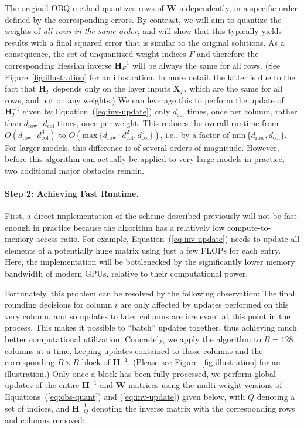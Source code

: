 The original OBQ method quantizes rows of $\mathbf{W}$ independently, in a specific order defined by the corresponding errors. By contrast, we will aim to quantize the weights of \emph{all rows in the same order}, and will show that this typically yields results with a final squared error that is similar to the original solutions. As a consequence, the set of unquantized weight indices $F$ and therefore the corresponding Hessian inverse $\mathbf{H}_F^{-1}$ will be always the same for all rows. (See Figure~\ref{fig:illustration} for an illustration. In more detail, the latter is due to the fact that $\mathbf{H}_F$ depends only on the layer inputs $\mathbf{X}_F$, which are the same for all rows, and not on any weights.) We can leverage this to perform the update of $\mathbf{H}_F^{-1}$ given by Equation~(\ref{eq:inv-update}) only $d_\text{col}$ times, once per column, rather than $d_\text{row} \cdot d_\text{col}$ times, once per weight. This reduces the overall runtime from $O(d_\text{row} \cdot d_\text{col}^3)$ to $O(\text{max} \, \{d_\text{row} \cdot d_\text{col}^2, d_\text{col}^3\})$, i.e., by a factor of $\text{min} \, \{d_\text{row}, d_\text{col}\}$. 
For larger models, this difference is of several orders of magnitude. However, before this algorithm can actually be applied to very large models in practice, two additional major obstacles remain. 

\paragraph{Step 2: Achieving Fast Runtime.} First, a direct implementation of the scheme described previously will not be fast enough in practice because the algorithm has a relatively low compute-to-memory-access ratio. For example, Equation~(\ref{eq:inv-update}) needs to update all elements of a potentially huge matrix using just a few FLOPs for each entry. Here, the implementation will be bottlenecked by the significantly lower memory bandwidth of modern GPUs, relative to their computational power.

Fortunately, this problem can be resolved by the following observation: The final rounding decisions for column $i$ are only affected by updates performed on this very column, and so updates to later columns are irrelevant at this point in the process. This makes it possible to ``batch'' updates together, thus achieving much better computational utilization. Concretely, we apply the algorithm to $B = 128$ columns at a time, keeping updates contained to those columns and the corresponding $B \times B$ block of $\mathbf{H}^{-1}$. (Please see Figure~\ref{fig:illustration} for an illustration.)  Only once a block has been fully processed, we perform global updates of the entire $\mathbf{H}^{-1}$ and $\mathbf{W}$ matrices using the multi-weight versions of Equations~(\ref{eq:obs-quant}) and (\ref{eq:inv-update}) given below, with $Q$ denoting a set of indices, and $\mathbf{H}_{-Q}^{-1}$ denoting the inverse matrix with the corresponding rows and columns removed:

